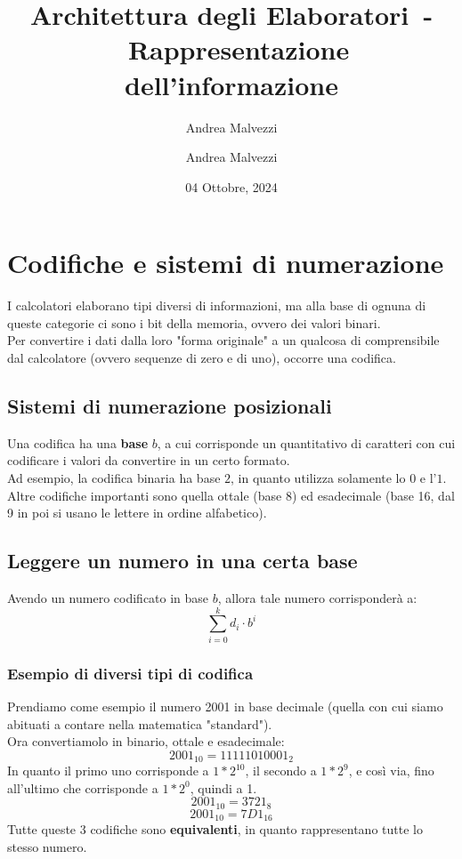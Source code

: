 \documentclass[12pt]{article}
\author{Andrea Malvezzi}
\title{\textbf{Architettura degli Elaboratori~-~Rappresentazione dell'informazione}}
\date{04 Ottobre, 2024}
\author{Andrea Malvezzi}
\begin{document}
\maketitle
\pagebreak
\tableofcontents
\pagebreak
\section{Codifiche e sistemi di numerazione}
I calcolatori elaborano tipi diversi di informazioni, ma alla base di ognuna di queste categorie ci sono i bit della memoria, ovvero dei valori binari.\\
Per convertire i dati dalla loro "forma originale" a un qualcosa di comprensibile dal calcolatore (ovvero sequenze di zero e di uno), occorre una codifica.
\subsection{Sistemi di numerazione posizionali}
Una codifica ha una \textbf{base} $b$, a cui corrisponde un quantitativo di caratteri con cui codificare i valori da convertire in un certo formato.\\
Ad esempio, la codifica binaria ha base $2$, in quanto utilizza solamente lo $0$ e l'$1$.\\
Altre codifiche importanti sono quella ottale (base 8) ed esadecimale (base 16, dal 9 in poi si usano le lettere in ordine alfabetico).
\subsection{Leggere un numero in una certa base}
Avendo un numero codificato in base $b$, allora tale numero corrisponderà a:
\begin{equation}
    \sum_{i=0}^{k} d_i \cdot b^i    \label{formula:leggere_codifica}    
\end{equation}
\subsubsection{Esempio di diversi tipi di codifica}
Prendiamo come esempio il numero 2001 in base decimale (quella con cui siamo abituati a contare nella matematica "standard").\\
Ora convertiamolo in binario, ottale e esadecimale:
\[
    2001_{10} = 11111010001_2
\]
In quanto il primo uno corrisponde a $1*2^{10}$, il secondo a $1*2^9$, e così via, fino all'ultimo che corrisponde a $1*2^0$, quindi a 1.
\[
    2001_{10} = 3721_8
\]
\[
    2001_{10} = 7D1_{16}
\]
Tutte queste 3 codifiche sono \textbf{equivalenti}, in quanto rappresentano tutte lo stesso numero.
\end{document}

